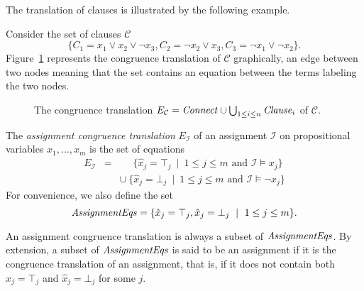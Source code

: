 \documentclass[smallextended]{svjour3}
\newcommand{\Assignment}{{\it AssignmentEqs}}
\newcommand{\Clause}{{\it Clause}}
\newcommand{\Connect}{{\it Connect}}
\begin{document}
\noindent The translation of clauses is illustrated by the following example.

\begin{example}\label{ex:np1}
Consider the set of clauses $\mathcal{C}$
\begin{equation*}
\big\{C_1 = x_1 \vee x_2 \vee \neg x_3, C_2 = \neg x_2 \vee x_3, C_3 = \neg x_1 \vee \neg x_2\big\}.
\end{equation*}
Figure~\ref{fig:npexamplebig} represents the congruence translation of
$\mathcal{C}$ graphically, an edge between two nodes meaning that the set
contains an equation between the terms labeling the two nodes.

\begin{figure}[htb]

\caption{The congruence translation $E_{\mathcal{C}} = \Connect \cup \bigcup_{1 \leq i \leq n}\Clause_i$ of $\mathcal{C}$.}
\label{fig:npexamplebig}
\end{figure}

\end{example}

\begin{definition}
\label{def:AssignmentCongruenceTranslation}
  The \emph{assignment congruence translation} $E_{\mathcal{I}}$ of an assignment $\mathcal{I}$ on propositional variables $x_1,\ldots,x_m$ is the set of equations
\begin{eqnarray*}
  E_{\mathcal{I}} & = & \phantom{\cup}\ \{ \hat{x}_j = \top_j \ \mid\  1 \leq j \leq m \text{ and } \mathcal{I} \models x_j \} \\
               &   & \cup\ \{ \hat{x}_j = \bot_j \ \mid\ 1 \leq j \leq m \text{ and } \mathcal{I} \models \neg x_j \}
\end{eqnarray*}
For convenience, we also define the set
\begin{equation*}
  \Assignment = \{ \hat{x}_j = \top_j, \hat{x}_j = \bot_j \ \mid\ 1 \leq j \leq m\}.
\end{equation*}
\end{definition}
\noindent
An assignment congruence translation is always a subset of
$\Assignment$.  By extension, a subset of $\Assignment$ is
said to be an assignment if it is the congruence translation of an assignment,
that is, if it does not contain both $\hat{x}_j = \top_j$ and $\hat{x}_j =
\bot_j$ for some $j$.
\end{document}
